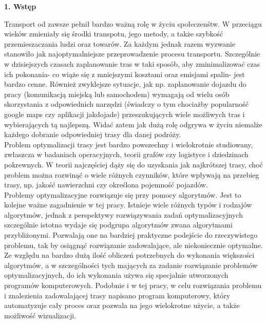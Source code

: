 \documentclass[a4paper, twoside, 12pt, justified]{article}
\begin{document}
	\begin{flushleft}
		\begin{LARGE}
			\textbf{1. Wstęp }
		\end{LARGE}
	\end{flushleft}
	
	\vspace{5mm} %
	
	Transport od zawsze pełnił bardzo ważną rolę w życiu społeczenśtw. W przeciągu wieków zmieniały się środki transpotu, jego metody, a także szybkość przemieszaczania ludzi oraz towarów. Za każdym jednak razem wyzwanie stanowiło jak najoptymalniejsze przeprowadzenie procesu transportu.
	Szczególnie w dzisiejszych czasach zaplanowanie tras w taki sposób, aby zminimalizować czas ich pokonania- co wiąże się z mniejszymi kosztami oraz emisjami spalin- jest bardzo cenne. Również zwyklejsze sytuacje, jak np. zaplanowanie dojazdu do pracy (komunikacją miejską lub samochodem) wymagają od wielu osób skorzystania z odpowiednich narzędzi (świadczy o tym chociażby popularność google maps czy aplikacji jakdojade) przeszukujących wiele możliwych tras i wybierających tą najlepszą. Widać zatem jak dużą rolę odgrywa w życiu niemalże każdego dobranie odpowiedniej trasy dla danej podróży.\\ 
	
	Problem optymalizacji trasy jest bardzo powszechny i wielokrotnie studiowany, zwłaszcza w badaniach operacyjnych, teorii grafów czy logistyce i dziedzinach pokrewnych. W teorii najczęściej dąży się do uzyskania jak najkrótszej trasy, choć problem można rozwinąć o wiele różnych czynników, które wpływają na przebieg trasy, np. jakość nawierzchni czy określona pojemność pojazdów.\\
	
	Problemy optymalizacyjne rozwiązuje się przy pomocy algorytmów. Jest to kolejne ważne zagadnienie w tej pracy. Istnieje wiele różnych typów i rodzajów algorytmów, jednak z perspektywy rozwiązywania zadań optymalizacyjnych szczególnie istotna wydaje się podgrupa algorytmów zwana algorytmami przybliżonymi. Pozwalają one na bardziej praktyczne podejście do rzeczywistego problemu, tak by osiągnąć rozwiązanie zadowalające, ale niekoniecznie optymalne.
	Ze względu na bardzo dużą ilość obliczeń potrzebnych do wykonania większości algorytmów, a w szczególności tych mających za zadanie rozwiązanie problemów optymalizacyjnych, do ich wykonania używa się specjalnie utworzonych programów komputerowych. Podobnie i w tej pracy, w celu rozwiązania problemu i znalezienia zadowalającej trasy napisano program komputerowy, który automatyzuje cały proces oraz pozwala na jego wielokrotne użycie, a także możliwość wizualizacji.\\ 
	
\end{document}
